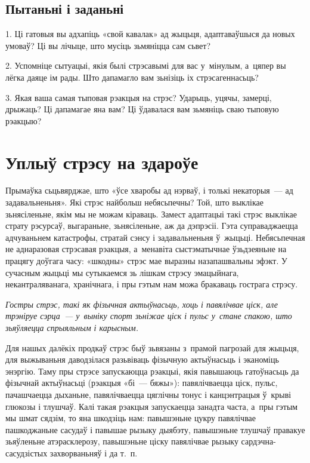 \subsection*{Пытаньні і заданьні}

1. Ці гатовыя вы адхапіць «свой кавалак» ад жыцьця, адаптаваўшыся да новых умоваў? Ці вы лічыце, што мусіць зьмяніцца сам сьвет?

2. Успомніце сытуацыі, якія былі стрэсавымі для вас у~мінулым, а~цяпер вы лёгка даяце ім рады. Што дапамагло вам зьнізіць іх стрэсагеннасьць?

3. Якая ваша самая тыповая рэакцыя на стрэс? Ударыць, уцячы, замерці, дрыжаць? Ці дапамагае яна вам? Ці ўдавалася вам зьмяніць сваю тыповую рэакцыю?


\section{Уплыў стрэсу на здароўе}

Прымаўка сьцьвярджае, што «ўсе хваробы ад нэрваў, і толькі некаторыя~--- ад задавальненьня». Які стрэс найбольш небясьпечны? Той, што выклікае зьнясіленьне, якім мы не можам кіраваць. Замест адаптацыі такі стрэс выклікае страту рэсурсаў, выгараньне, зьнясіленьне, аж да дэпрэсіі. Гэта суправаджаецца адчуваньнем катастрофы, стратай сэнсу і задавальненьня ў~жыцьці. Небясьпечная не аднаразовая стрэсавая рэакцыя, а~менавіта сыстэматычнае ўзьдзеяньне на працягу доўгага часу: «шкодны» стрэс мае выразны назапашвальны эфэкт. У сучасным жыцьці мы сутыкаемся зь лішкам стрэсу эмацыйнага, некантраляванага, хранічнага, і пры гэтым нам можа бракаваць гострага стрэсу.

\emph{Гостры стрэс, такі як фізычная актыўнасьць, хоць і павялічвае ціск, але трэніруе сэрца~--- у~выніку спорт зьніжае ціск і пульс у~стане спакою, што зьяўляецца спрыяльным і карысным.}

Для нашых далёкіх продкаў стрэс быў зьвязаны з~прамой пагрозай для жыцьця, для выжываньня даводзілася разьвіваць фізычную актыўнасьць і эканоміць энэргію. Таму пры стрэсе запускаюцца рэакцыі, якія павышаюць гатоўнасьць да фізычнай актыўнасьці (рэакцыя «бі~--- бяжы»): павялічваецца ціск, пульс, пачашчаецца дыханьне, павялічваецца цяглічны тонус і канцэнтрацыя ў~крыві глюкозы і тлушчаў. Калі такая рэакцыя запускаецца занадта часта, а~пры гэтым мы шмат сядзім, то яна шкодзіць нам: павышэньне цукру павялічвае пашкоджаньне сасудаў і павышае рызыку дыябэту, павышэньне тлушчаў правакуе зьяўленьне атэрасклерозу, павышэньне ціску павялічвае рызыку сардэчна-сасудзістых захворваньняў і да т.~п.

